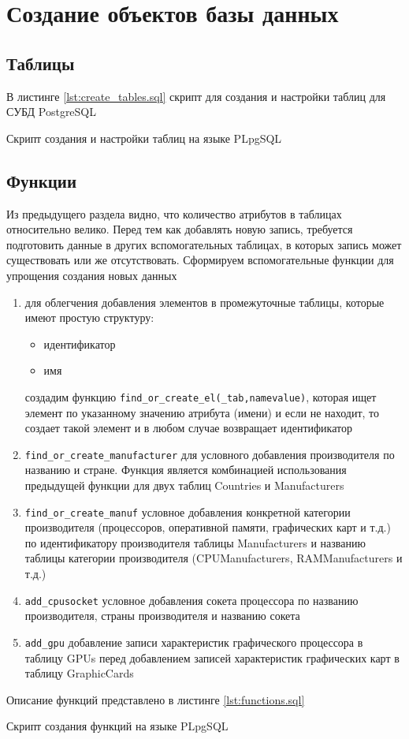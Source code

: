 \section{Создание объектов базы данных}
\subsection{Таблицы}
В листинге \ref{lst:create_tables.sql} скрипт для создания и настройки таблиц для СУБД PostgreSQL

{Скрипт создания и настройки таблиц на языке PL\/pgSQL}

\subsection{Функции}
Из предыдущего раздела видно, что количество атрибутов в таблицах относительно велико. Перед тем как добавлять новую запись, требуется подготовить данные в других вспомогательных таблицах, в которых запись может существовать или же отсутствовать. Сформируем вспомогательные функции для упрощения создания новых данных
\begin{enumerate}
	\item 
		для облегчения добавления элементов в промежуточные таблицы, которые имеют простую структуру:
		\begin{itemize}
			\item 
				идентификатор
			\item
				имя
		\end{itemize}
		создадим функцию \verb|find_or_create_el(_tab,namevalue)|, которая ищет элемент по указанному значению атрибута (имени) и если не находит, то создает такой элемент и в любом случае возвращает идентификатор
	\item
		\verb|find_or_create_manufacturer| для условного добавления производителя по названию и стране. Функция является комбинацией использования предыдущей функции для двух таблиц Countries и Manufacturers
	\item
		\verb|find_or_create_manuf| условное добавления конкретной категории производителя (процессоров, оперативной памяти, графических карт и т.д.) по идентификатору производителя таблицы Manufacturers и названию таблицы категории производителя (CPUManufacturers, RAMManufacturers и т.д.)
	\item
		\verb|add_cpusocket| условное добавления сокета процессора по названию производителя, страны производителя и названию сокета
	\item
		\verb|add_gpu| добавление записи характеристик графического процессора в таблицу GPUs перед добавлением записей характеристик графических карт в таблицу GraphicCards
\end{enumerate}
Описание функций представлено в листинге \ref{lst:functions.sql}

{Скрипт создания функций на языке PL\/pgSQL}
